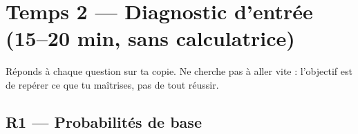 
\section*{Temps 2 — Diagnostic d'entrée \hfill
\normalfont\small(15–20 min, sans calculatrice)}

Réponds à chaque question sur ta copie. Ne cherche pas à aller vite : l'objectif est de repérer ce que tu maîtrises, pas de tout réussir.

\bigskip

\subsection*{R1 — Probabilités de base}

